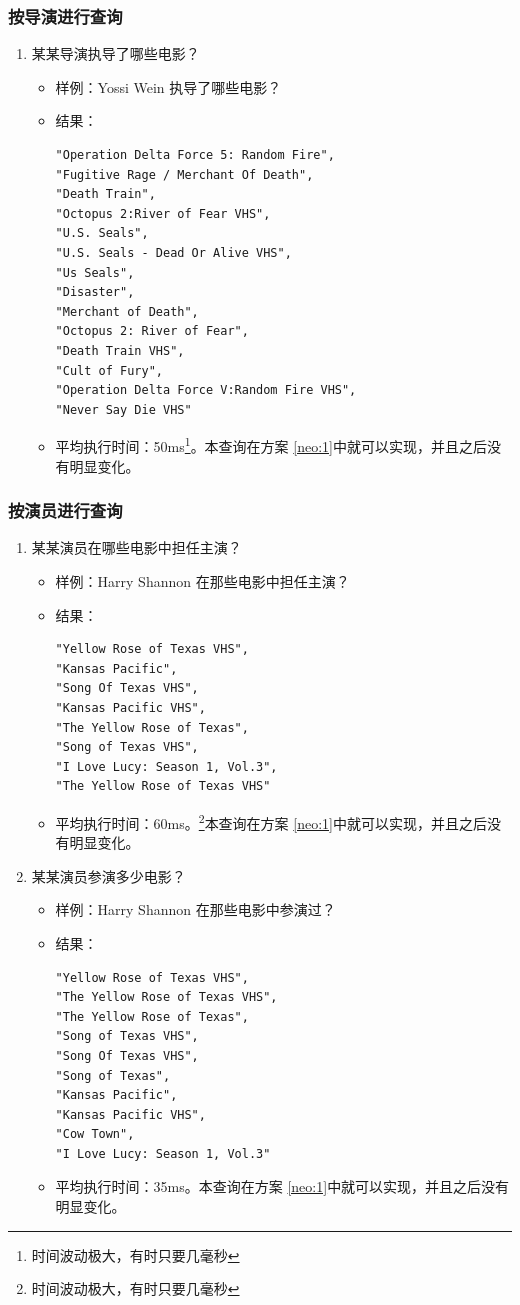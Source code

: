 \documentclass{ctexrep}
\begin{document}
	\subsubsection{按导演进行查询}
		\begin{enumerate}
		\item 某某导演执导了哪些电影？\begin{itemize}
			\item 样例：Yossi Wein 执导了哪些电影？
			\item 结果：\begin{lstlisting}
"Operation Delta Force 5: Random Fire",
"Fugitive Rage / Merchant Of Death",
"Death Train",
"Octopus 2:River of Fear VHS",
"U.S. Seals",
"U.S. Seals - Dead Or Alive VHS",
"Us Seals",
"Disaster",
"Merchant of Death",
"Octopus 2: River of Fear",
"Death Train VHS",
"Cult of Fury",
"Operation Delta Force V:Random Fire VHS",
"Never Say Die VHS"
			\end{lstlisting}
			\item 平均执行时间：50ms\footnote{时间波动极大，有时只要几毫秒}。本查询在方案 \ref{neo:1}中就可以实现，并且之后没有明显变化。
		\end{itemize}
	\end{enumerate}
	\subsubsection{按演员进行查询}
		\begin{enumerate}
		\item 某某演员在哪些电影中担任主演？\begin{itemize}
			\item 样例：Harry Shannon 在那些电影中担任主演？
			\item 结果：\begin{lstlisting}
"Yellow Rose of Texas VHS",
"Kansas Pacific",
"Song Of Texas VHS",
"Kansas Pacific VHS",
"The Yellow Rose of Texas",
"Song of Texas VHS",
"I Love Lucy: Season 1, Vol.3",
"The Yellow Rose of Texas VHS"
			\end{lstlisting}
			\item 平均执行时间：60ms。\footnote{时间波动极大，有时只要几毫秒}本查询在方案 \ref{neo:1}中就可以实现，并且之后没有明显变化。
		\end{itemize}
		\item 某某演员参演多少电影？\begin{itemize}
			\item 样例：Harry Shannon 在那些电影中参演过？
			\item 结果：\begin{lstlisting}
"Yellow Rose of Texas VHS",
"The Yellow Rose of Texas VHS",
"The Yellow Rose of Texas",
"Song of Texas VHS",
"Song Of Texas VHS",
"Song of Texas",
"Kansas Pacific",
"Kansas Pacific VHS",
"Cow Town",
"I Love Lucy: Season 1, Vol.3"
			\end{lstlisting}
			\item 平均执行时间：35ms。本查询在方案 \ref{neo:1}中就可以实现，并且之后没有明显变化。
		\end{itemize}
	\end{enumerate}
\end{document}
